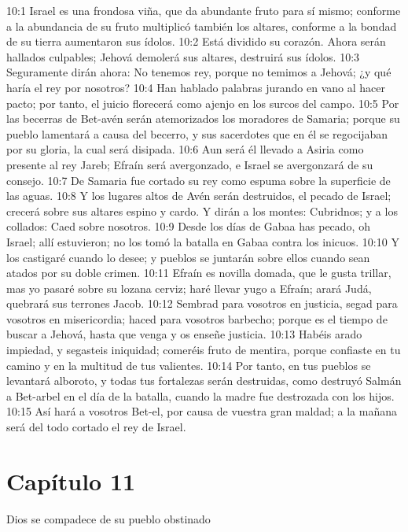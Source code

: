 									10:1 Israel es una frondosa viña, que da abundante fruto para sí mismo; conforme a la abundancia de su fruto multiplicó también los altares, conforme a la bondad de su tierra aumentaron sus ídolos. 
									10:2 Está dividido su corazón. Ahora serán hallados culpables; Jehová demolerá sus altares, destruirá sus ídolos. 
									10:3 Seguramente dirán ahora: No tenemos rey, porque no temimos a Jehová; ¿y qué haría el rey por nosotros? 
									10:4 Han hablado palabras jurando en vano al hacer pacto; por tanto, el juicio florecerá como ajenjo en los surcos del campo. 
									10:5 Por las becerras de Bet-avén serán atemorizados los moradores de Samaria; porque su pueblo lamentará a causa del becerro, y sus sacerdotes que en él se regocijaban por su gloria, la cual será disipada. 
									10:6 Aun será él llevado a Asiria como presente al rey Jareb; Efraín será avergonzado, e Israel se avergonzará de su consejo. 
									10:7 De Samaria fue cortado su rey como espuma sobre la superficie de las aguas. 
									10:8 Y los lugares altos de Avén serán destruidos, el pecado de Israel; crecerá sobre sus altares espino y cardo. Y dirán a los montes: Cubridnos; y a los collados: Caed sobre nosotros. 
									10:9 Desde los días de Gabaa has pecado, oh Israel; allí estuvieron; no los tomó la batalla en Gabaa contra los inicuos. 
									10:10 Y los castigaré cuando lo desee; y pueblos se juntarán sobre ellos cuando sean atados por su doble crimen. 
									10:11 Efraín es novilla domada, que le gusta trillar, mas yo pasaré sobre su lozana cerviz; haré llevar yugo a Efraín; arará Judá, quebrará sus terrones Jacob. 
									10:12 Sembrad para vosotros en justicia, segad para vosotros en misericordia; haced para vosotros barbecho; porque es el tiempo de buscar a Jehová, hasta que venga y os enseñe justicia. 
									10:13 Habéis arado impiedad, y segasteis iniquidad; comeréis fruto de mentira, porque confiaste en tu camino y en la multitud de tus valientes. 
									10:14 Por tanto, en tus pueblos se levantará alboroto, y todas tus fortalezas serán destruidas, como destruyó Salmán a Bet-arbel en el día de la batalla, cuando la madre fue destrozada con los hijos. 
									10:15 Así hará a vosotros Bet-el, por causa de vuestra gran maldad; a la mañana será del todo cortado el rey de Israel. 
									\section*{Capítulo 11 }
										Dios se compadece de su pueblo obstinado 
										
